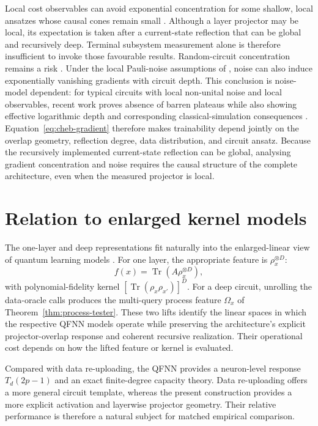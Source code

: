 \documentclass[pdflatex,sn-mathphys,NameDate,iicol]{sn-jnl}
\newcommand{\Tr}{\operatorname{Tr}}
\begin{document}
Local cost observables can avoid exponential concentration for some shallow,
local ansatzes whose causal cones remain small
\citep{cerezo2021cost}. Although a layer projector may be local, its
expectation is taken after a current-state reflection that can be global and
recursively deep. Terminal subsystem measurement alone is therefore
insufficient to invoke those favourable results. Random-circuit
concentration remains a risk \citep{mcclean2018barren}. Under the local
Pauli-noise assumptions of \citet{wang2021noise}, noise can also induce
exponentially vanishing gradients with circuit depth. This conclusion is
noise-model dependent: for typical circuits with local non-unital noise and
local observables, recent work proves absence of barren plateaus while also
showing effective logarithmic depth and corresponding classical-simulation
consequences \citep{mele2026noise}.
Equation~\eqref{eq:cheb-gradient} therefore makes trainability depend jointly
on the overlap geometry, reflection degree, data distribution, and circuit
ansatz. Because the recursively implemented current-state reflection can be
global, analysing gradient concentration and noise requires the causal
structure of the complete architecture, even when the measured projector is
local.

\section{Relation to enlarged kernel models}
\label{sec:kernel-reconciliation}

The one-layer and deep representations fit naturally into the enlarged-linear
view of quantum learning models
\citep{schuld2021kernel,jerbi2023beyond}. For one layer, the appropriate
feature is $\rho_x^{\otimes D}$:
\begin{equation}
 f(x)=\Tr(A\rho_x^{\otimes D}),
\end{equation}
with polynomial-fidelity kernel
$[\Tr(\rho_x\rho_{x'})]^D$. For a deep circuit, unrolling the data-oracle
calls produces the multi-query process feature $\Omega_x$ of
Theorem~\ref{thm:process-tester}. These two lifts identify the linear spaces
in which the respective QFNN models operate while preserving the
architecture's explicit projector-overlap response and coherent recursive
realization. Their operational cost depends on how the lifted feature or
kernel is evaluated.

Compared with data re-uploading, the QFNN provides a neuron-level response
$T_d(2p-1)$ and an exact finite-degree capacity theory. Data re-uploading
offers a more general circuit template, whereas the present construction
provides a more explicit activation and layerwise projector geometry. Their
relative performance is therefore a natural subject for matched empirical
comparison.
\end{document}
